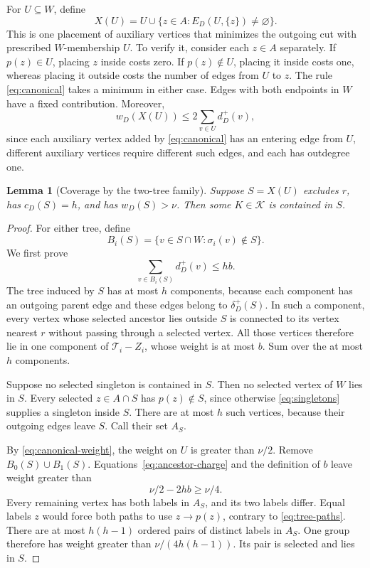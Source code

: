 \documentclass[11pt]{article}
\newtheorem{lemma}[theorem]{Lemma}
\theoremstyle{definition}
\theoremstyle{remark}
\begin{document}
For \(U\subseteq W\), define
\begin{equation}
 X(U)=U\cup\{z\in A:E_D(U,\{z\})\ne\varnothing\}.
 \label{eq:canonical}
\end{equation}
This is one placement of auxiliary vertices that minimizes the outgoing cut with prescribed \(W\)-membership \(U\). To verify it, consider each \(z\in A\) separately. If \(p(z)\in U\), placing \(z\) inside costs zero. If \(p(z)\notin U\), placing it inside costs one, whereas placing it outside costs the number of edges from \(U\) to \(z\). The rule \eqref{eq:canonical} takes a minimum in either case. Edges with both endpoints in \(W\) have a fixed contribution. Moreover,
\begin{equation}
 w_D(X(U))\le2\sum_{v\in U}d_D^+(v),
 \label{eq:canonical-weight}
\end{equation}
since each auxiliary vertex added by \eqref{eq:canonical} has an entering edge from \(U\), different auxiliary vertices require different such edges, and each has outdegree one.

\begin{lemma}[Coverage by the two-tree family]
\label{lem:slow-coverage}
Suppose \(S=X(U)\) excludes \(r\), has \(c_D(S)=h\), and has \(w_D(S)>\nu\). Then some \(K\in\mathcal K\) is contained in \(S\).
\end{lemma}
\begin{proof}
For either tree, define
\[
 B_i(S)=\{v\in S\cap W:\sigma_i(v)\notin S\}.
\]
We first prove
\begin{equation}
 \sum_{v\in B_i(S)}d_D^+(v)\le hb.
 \label{eq:ancestor-charge}
\end{equation}
The tree induced by \(S\) has at most \(h\) components, because each component has an outgoing parent edge and these edges belong to \(\delta_D^+(S)\). In such a component, every vertex whose selected ancestor lies outside \(S\) is connected to its vertex nearest \(r\) without passing through a selected vertex. All those vertices therefore lie in one component of \(\mathcal T_i-Z_i\), whose weight is at most \(b\). Sum over the at most \(h\) components.

Suppose no selected singleton is contained in \(S\). Then no selected vertex of \(W\) lies in \(S\). Every selected \(z\in A\cap S\) has \(p(z)\notin S\), since otherwise \eqref{eq:singletons} supplies a singleton inside \(S\). There are at most \(h\) such vertices, because their outgoing edges leave \(S\). Call their set \(A_S\).

By \eqref{eq:canonical-weight}, the weight on \(U\) is greater than \(\nu/2\). Remove \(B_0(S)\cup B_1(S)\). Equations~\eqref{eq:ancestor-charge} and the definition of \(b\) leave weight greater than
\[
 \nu/2-2hb\ge\nu/4.
\]
Every remaining vertex has both labels in \(A_S\), and its two labels differ. Equal labels \(z\) would force both paths to use \(z\to p(z)\), contrary to \eqref{eq:tree-paths}. There are at most \(h(h-1)\) ordered pairs of distinct labels in \(A_S\). One group therefore has weight greater than \(\nu/(4h(h-1))\). Its pair is selected and lies in \(S\).
\end{proof}
\end{document}
